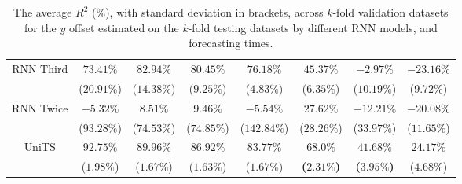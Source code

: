 \begin{table}[!ht]
{\begin{tabular}{|c|c|c|c|c|c|c|c|}
			\multirow{2}{*}{RNN Third} & $73.41\%$ & $82.94\%$ & $80.45\%$ & $76.18\%$ & $45.37\%$ & $-2.97\%$ & $-23.16\%$ \\
			 & ($20.91\%$) & ($14.38\%$) & ($9.25\%$) & ($4.83\%$) & ($6.35\%$) & ($10.19\%$) & ($9.72\%$) \\ \hline
			\multirow{2}{*}{RNN Twice} & $-5.32\%$ & $8.51\%$ & $9.46\%$ & $-5.54\%$ & $27.62\%$ & $-12.21\%$ & $-20.08\%$ \\
			 & ($93.28\%$) & ($74.53\%$) & ($74.85\%$) & ($142.84\%$) & ($28.26\%$) & ($33.97\%$) & ($11.65\%$) \\ \hline
			\multirow{2}{*}{UniTS} & $92.75\%$ & $89.96\%$ & $86.92\%$ & $83.77\%$ & $\mathbf{68.0\%}$ & $\mathbf{41.68\%}$ & $24.17\%$ \\
			 & ($1.98\%$) & ($1.67\%$) & ($1.63\%$) & ($1.67\%$) & \textbf{(}$\mathbf{2.31\%}$\textbf{)} & \textbf{(}$\mathbf{3.95\%}$\textbf{)} & ($4.68\%$) \\ \hline
		\end{tabular}
	}
	\caption{The average $R^{2}$ (\%), with standard deviation in brackets, across $k$-fold validation datasets for the $y$ offset estimated on the $k$-fold testing datasets by different RNN models, and forecasting times.}
	\label{tab:all_latitude_no_abs_R2}
\end{table}